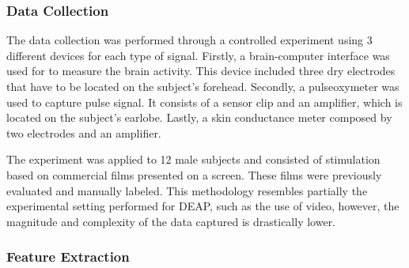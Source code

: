 \documentclass{sig-alternate}
\begin{document}
\subsubsection{Data Collection}

The data collection was performed through a controlled 
experiment using 3 different devices for each type of signal. 
Firstly,  a  brain-computer interface was used for to measure 
the brain activity. This device included 
three dry electrodes that have to be located on the subject's 
forehead. Secondly, a pulseoxymeter was used to capture 
pulse signal. It consists of a sensor clip and an amplifier, which 
is located  on the  subject's earlobe. Lastly, a skin 
conductance meter composed by two electrodes and an amplifier. 

The experiment  was applied to 12  male subjects and  
consisted of stimulation based  on commercial 
films presented on a screen. These films were previously 
evaluated and manually labeled. This methodology resembles
partially the experimental setting performed for DEAP, such
as the use of video, however, the magnitude and complexity of
the data captured is drastically lower.


\subsubsection{Feature Extraction}
\end{document}
